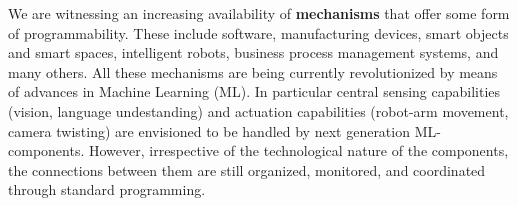 



We are witnessing an increasing availability of \textbf{mechanisms}
that offer some form of programmability.
These include software, manufacturing devices, smart objects and smart
spaces, intelligent robots, business process management systems, and
many others.
All these mechanisms are being currently revolutionized by means of
advances in Machine Learning (ML).  In particular central sensing
capabilities (vision, language undestanding) and actuation
capabilities (robot-arm movement, camera twisting) are envisioned to be handled
by next generation ML-components.
However, irrespective of the technological nature of the components, the connections between them are still
organized, monitored, and coordinated through standard programming.

